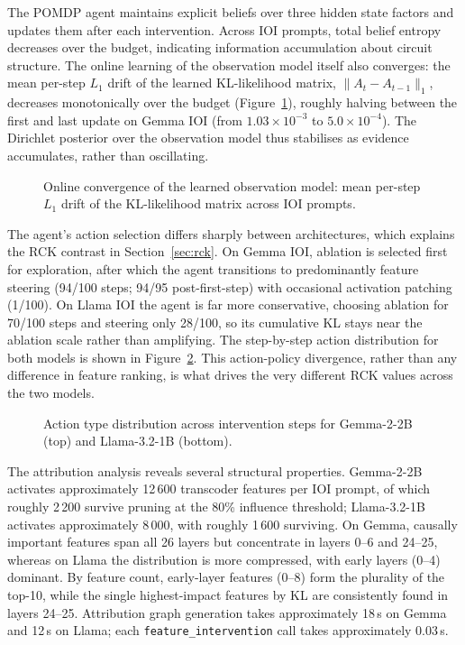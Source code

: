 The POMDP agent maintains explicit beliefs over three hidden state
factors and updates them after each intervention.  Across IOI prompts,
total belief entropy decreases over the budget, indicating information
accumulation about circuit structure.  The online learning of the
observation model itself also converges: the mean per-step $L_1$ drift
of the learned KL-likelihood matrix, $\|A_t - A_{t-1}\|_1$, decreases
monotonically over the budget (Figure~\ref{fig:aconv}), roughly halving
between the first and last update on Gemma IOI (from $1.03\times10^{-3}$
to $5.0\times10^{-4}$).  The Dirichlet posterior over the observation
model thus stabilises as evidence accumulates, rather than oscillating.

\begin{figure}[H]
\centering

\caption{Online convergence of the learned observation model: mean
per-step $L_1$ drift of the KL-likelihood matrix across IOI prompts.}
\label{fig:aconv}
\end{figure}

The agent's action selection differs sharply between architectures,
which explains the RCK contrast in Section~\ref{sec:rck}.  On Gemma
IOI, ablation is selected first for exploration, after which the agent
transitions to predominantly feature steering (94/100 steps; 94/95
post-first-step) with occasional activation patching (1/100).  On
Llama IOI the agent is far more conservative, choosing ablation for
70/100 steps and steering only 28/100, so its cumulative KL stays
near the ablation scale rather than amplifying.  The step-by-step
action distribution for both models is shown in
Figure~\ref{fig:action_dist}.  This action-policy divergence, rather
than any difference in feature ranking, is what drives the very
different RCK values across the two models.

\begin{figure}[H]
\centering

\caption{Action type distribution across intervention steps for Gemma-2-2B (top) and Llama-3.2-1B (bottom).}
\label{fig:action_dist}
\end{figure}

The attribution analysis reveals several structural properties.
Gemma-2-2B activates approximately 12\,600 transcoder features per
IOI prompt, of which roughly 2\,200 survive pruning at the 80\%
influence threshold; Llama-3.2-1B activates approximately 8\,000,
with roughly 1\,600 surviving.  On Gemma, causally important features
span all 26 layers but concentrate in layers 0--6 and 24--25, whereas
on Llama the distribution is more compressed, with early layers
(0--4) dominant.  By feature count, early-layer features (0--8)
form the plurality of the top-10, while the single highest-impact
features by KL are consistently found in layers 24--25.
Attribution graph generation takes approximately
18\,s on Gemma and 12\,s on Llama; each
\texttt{feature\_intervention} call takes approximately 0.03\,s.


